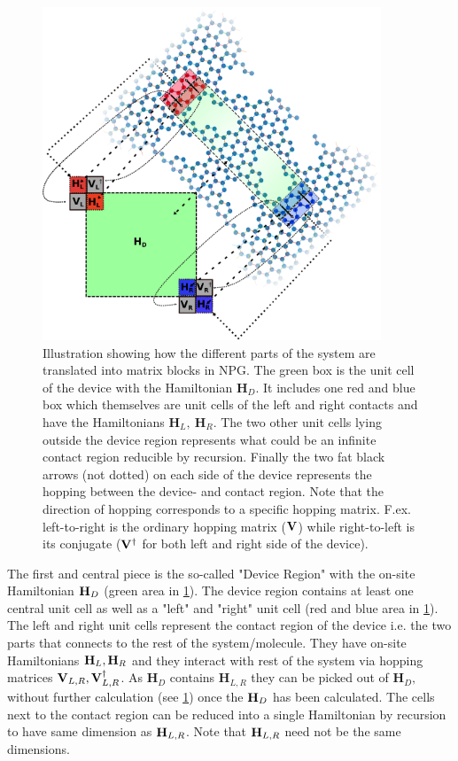 \begin{figure}[ht]
	\centering
	\includegraphics[width=0.9\textwidth]{Figures/illu.eps}
	\caption{Illustration showing how the different parts of the system are translated into matrix blocks in NPG. The green box is the unit cell of the device with the Hamiltonian \(\textbf{H}_D\). It includes one red and blue box which themselves are unit cells of the left and right contacts and have the Hamiltonians \(\textbf{H}_L,\ \textbf{H}_R\). The two other unit cells lying outside the device region represents what could be an infinite contact region reducible by recursion. Finally the two fat black arrows (not dotted) on each side of the device represents the hopping between the device- and contact region. Note that the direction of hopping corresponds to a specific hopping matrix. F.ex. left-to-right is the ordinary hopping matrix (\(\vb{V}\)) while right-to-left is its conjugate (\(\vb{V}^{\dagger}\) for both left and right side of the device).}
	\label{systemillu}
\end{figure}
The first and central piece is the so-called "Device Region" with the on-site Hamiltonian \(\vb{H}_D\) (green area in \cref{systemillu}). The device region contains at least one central unit cell as well as a "left" and "right" unit cell (red and blue area in \cref{systemillu}). The left and right unit cells represent the contact region of the device i.e. the two parts that connects to the rest of the system/molecule. They have on-site Hamiltonians \(\vb{H}_L,\vb{H}_R\) and they interact with rest of the system via hopping matrices \(\vb{V}_{L,R},\vb{V}^{\dagger}_{L,R}\). As \(\textbf{H}_D\) contains \(\textbf{H}_{L,R}\) they can be picked out of \(\textbf{H}_D,\)  without further calculation (see \cref{systemillu}) once the \(\vb{H}_D\) has been calculated. The cells next to the contact region can be reduced into a single Hamiltonian by recursion to have same dimension as \(\vb{H}_{L,R}\). Note that \(\vb{H}_{L,R}\) need not be the same dimensions.
